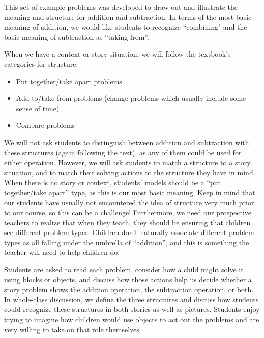 \documentclass[nooutcomes,noauthor,handout]{ximera}
\begin{document}
\newpage
\begin{instructorNotes}
This set of example problems was developed to draw out and illustrate the meaning and structure for addition and subtraction. In terms of the most basic meaning of addition, we would like students to recognize ``combining" and the basic meaning of subtraction as ``taking from''. 

When we have a context or story situation, we will follow the textbook's categories for structure:
\begin{itemize}
\item Put together/take apart problems
\item Add to/take from problems (change problems which usually include some sense of time)
\item Compare problems
\end{itemize}
We will not ask students to distinguish between addition and subtraction with these structures (again following the text), as any of them could be used for either operation.  However, we will ask students to match a structure to a story situation, and to match their solving actions to the structure they have in mind. When there is no story or context, students' models should be a ``put together/take apart'' type, as this is our most basic meaning. Keep in mind that our students have usually not encountered the idea of structure very much prior to our course, so this can be a challenge! Furthermore, we need our prospective teachers to realize that when they teach, they should be ensuring that children see different problem types. Children don't naturally associate different problem types as all falling under the umbrella of ``addition'', and this is something the teacher will need to help children do.

Students are asked to read each problem, consider how a child might solve it using blocks or objects, and discuss how those actions help us decide whether a story problem shows the addition operation, the subtraction operation, or both.  In whole-class discussion, we define the three structures and discuss how students could recognize these structures in both stories as well as pictures. Students enjoy trying to imagine how children would use objects to act out the problems and are very willing to take on that role themselves.



\end{instructorNotes}
\end{document}
